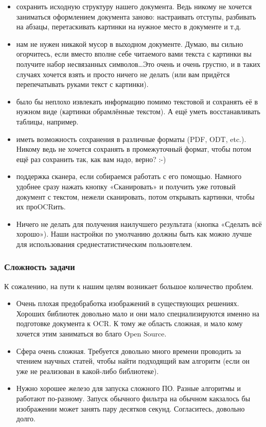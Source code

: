 \documentclass[10pt, a5paper]{article}
\begin{document}
\begin{itemize}
  \item сохранить исходную структуру нашего документа. Ведь никому не хочется заниматься оформлением документа заново: настраивать отступы, разбивать на абзацы, перетаскивать картинки на нужное место в документе и т.д.
  \item нам не нужен никакой мусор в выходном документе. Думаю, вы сильно огорчитесь, если вместо вполне себе читаемого вами текста с картинки вы получите набор несвязанных символов\ldots Это очень и очень грустно, и в таких случаях хочется взять и просто ничего не делать (или вам придётся перепечатывать руками текст с картинки).
  \item было бы неплохо извлекать информацию помимо текстовой и сохранять её в нужном виде (картинки обрамлённые текстом). А ещё уметь восстанавливать таблицы, например.
  \item иметь возможность сохранения в различные форматы (PDF, ODT, etc.). Никому ведь не хочется сохранять в промежуточный формат, чтобы потом ещё раз сохранить так, как вам надо, верно? :-)
  \item поддержка сканера, если собираемся работать с его помощью. Намного удобнее сразу нажать кнопку «Сканировать» и получить уже готовый документ с текстом, нежели сканировать, потом открывать картинки, чтобы их проOCRить.
  \item Ничего не делать для получения наилучшего результата (кнопка «Сделать всё хорошо»). Наши настройки по умолчанию должны быть как можно лучше для использования среднестатистическим пользовтелем.
\end{itemize}

\subsubsection*{Сложность задачи}

К сожалению, на пути к нашим целям возникает большое количество проблем.

\begin{itemize}
  \item Очень плохая предобработка изображений в существующих решениях. Хороших библиотек довольно мало и они мало специализируются именно на подготовке документа к OCR. К тому же область сложная, и мало кому хочется этим заниматься во благо Open Source.
  \item Сфера очень сложная. Требуется довольно много времени проводить за чтением научных статей, чтобы найти подходящий вам алгоритм (если он уже не реализован в какой-либо библиотеке).
  \item Нужно хорошее железо для запуска сложного ПО. Разные алгоритмы и работают по-разному. Запуск обычного фильтра на обычном какзалось бы изображении может занять пару десятков секунд. Согласитесь, довольно долго.
\end{itemize}
\end{document}
